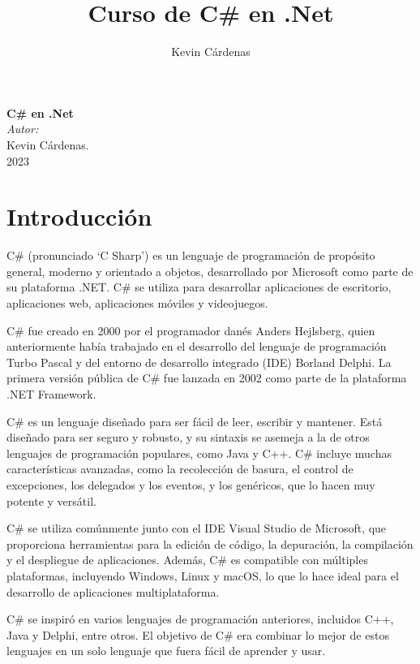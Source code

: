 \documentclass[executivepaper]{article}
\title{Curso de C\# en .Net}
\author{Kevin Cárdenas}
\begin{document}
\begin{titlepage}
    \begin{center}
        {\Huge \textbf{C\# en .Net}}
        \\[19cm]
        
        \large\emph{Autor:}\\
        Kevin Cárdenas.
        \\
        2023
    \end{center}
\end{titlepage}

\newpage
\tableofcontents
\newpage

\section{Introducción}
C\# (pronunciado \enquote*{C Sharp}) es un lenguaje de programación de propósito general, moderno y orientado a objetos, desarrollado por Microsoft como parte de su plataforma .NET. C\# se utiliza para desarrollar aplicaciones de escritorio, aplicaciones web, aplicaciones móviles y videojuegos.

C\# fue creado en 2000 por el programador danés Anders Hejlsberg, quien anteriormente había trabajado en el desarrollo del lenguaje de programación Turbo Pascal y del entorno de desarrollo integrado (IDE) Borland Delphi. La primera versión pública de C\# fue lanzada en 2002 como parte de la plataforma .NET Framework.

C\# es un lenguaje diseñado para ser fácil de leer, escribir y mantener. Está diseñado para ser seguro y robusto, y su sintaxis se asemeja a la de otros lenguajes de programación populares, como Java y C++. C\# incluye muchas características avanzadas, como la recolección de basura, el control de excepciones, los delegados y los eventos, y los genéricos, que lo hacen muy potente y versátil.

C\# se utiliza comúnmente junto con el IDE Visual Studio de Microsoft, que proporciona herramientas para la edición de código, la depuración, la compilación y el despliegue de aplicaciones. Además, C\# es compatible con múltiples plataformas, incluyendo Windows, Linux y macOS, lo que lo hace ideal para el desarrollo de aplicaciones multiplataforma.

C\# se inspiró en varios lenguajes de programación anteriores, incluidos C++, Java y Delphi, entre otros. El objetivo de C\# era combinar lo mejor de estos lenguajes en un solo lenguaje que fuera fácil de aprender y usar.
\end{document}
